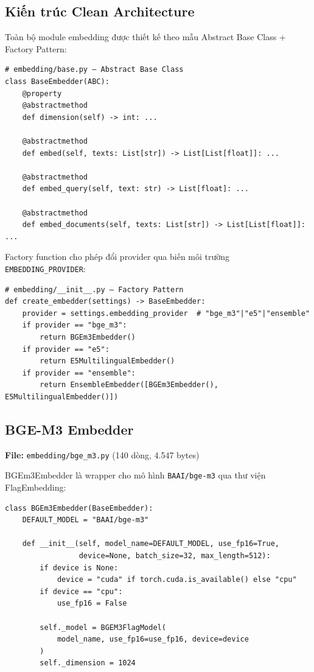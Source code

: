 \documentclass[../DoAn.tex]{subfiles}
\begin{document}
\subsection{Kiến trúc Clean Architecture}

Toàn bộ module embedding được thiết kế theo mẫu Abstract Base Class + Factory Pattern:

\begin{verbatim}
# embedding/base.py — Abstract Base Class
class BaseEmbedder(ABC):
    @property
    @abstractmethod
    def dimension(self) -> int: ...

    @abstractmethod
    def embed(self, texts: List[str]) -> List[List[float]]: ...

    @abstractmethod
    def embed_query(self, text: str) -> List[float]: ...

    @abstractmethod
    def embed_documents(self, texts: List[str]) -> List[List[float]]: ...
\end{verbatim}

Factory function cho phép đổi provider qua biến môi trường \texttt{EMBEDDING\_PROVIDER}:
\begin{verbatim}
# embedding/__init__.py — Factory Pattern
def create_embedder(settings) -> BaseEmbedder:
    provider = settings.embedding_provider  # "bge_m3"|"e5"|"ensemble"
    if provider == "bge_m3":
        return BGEm3Embedder()
    if provider == "e5":
        return E5MultilingualEmbedder()
    if provider == "ensemble":
        return EnsembleEmbedder([BGEm3Embedder(), E5MultilingualEmbedder()])
\end{verbatim}

\subsection{BGE-M3 Embedder}
\textbf{File:} \texttt{embedding/bge\_m3.py} (140 dòng, 4.547 bytes)

BGEm3Embedder là wrapper cho mô hình \texttt{BAAI/bge-m3} qua thư viện FlagEmbedding:
\begin{verbatim}
class BGEm3Embedder(BaseEmbedder):
    DEFAULT_MODEL = "BAAI/bge-m3"

    def __init__(self, model_name=DEFAULT_MODEL, use_fp16=True,
                 device=None, batch_size=32, max_length=512):
        if device is None:
            device = "cuda" if torch.cuda.is_available() else "cpu"
        if device == "cpu":
            use_fp16 = False

        self._model = BGEM3FlagModel(
            model_name, use_fp16=use_fp16, device=device
        )
        self._dimension = 1024
\end{verbatim}
\end{document}
